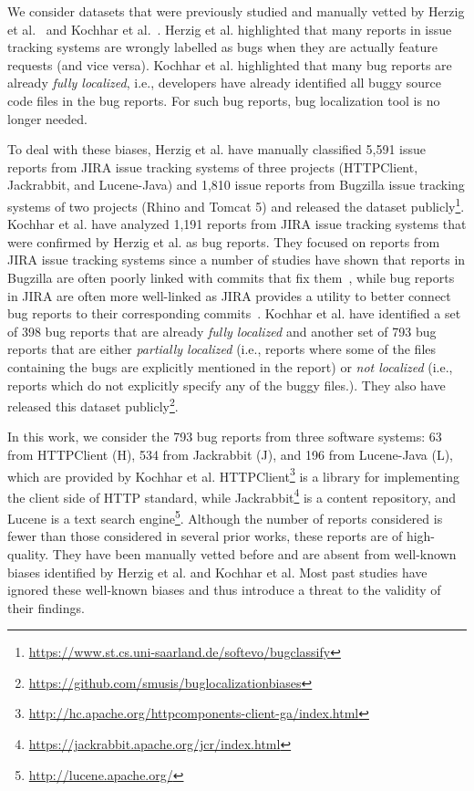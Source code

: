 We consider datasets that were previously studied and manually vetted by Herzig et al.~\cite{HerzigJZ13} and Kochhar et al.~\cite{KochharTL14}. Herzig et al. highlighted that many reports in issue tracking systems are wrongly labelled as bugs when they are actually feature requests (and vice versa). Kochhar et al. highlighted that many bug reports are already {\em fully localized}, i.e., developers have already identified all buggy source code files in the bug reports. For such bug reports, bug localization tool is no longer needed.

To deal with these biases, Herzig et al. have manually classified 5,591 issue reports from JIRA issue tracking systems of three projects (HTTPClient, Jackrabbit, and Lucene-Java) and 1,810 issue reports from Bugzilla issue tracking systems of two projects (Rhino and Tomcat 5) and released the dataset publicly\footnote{\url{https://www.st.cs.uni-saarland.de/softevo/bugclassify}}. Kochhar et al. have analyzed 1,191 reports from JIRA issue tracking systems that were confirmed by Herzig et al. as bug reports. They focused on reports from JIRA issue tracking systems since a number of studies have shown that reports in Bugzilla are often poorly linked with commits that fix them~\cite{BachmannBRDB10,BirdBADBFD09}, while bug reports in JIRA are often more well-linked as JIRA provides a utility to better connect bug reports to their corresponding commits~\cite{BissyandeTWLJR13}. Kochhar et al. have identified a set of 398 bug reports that are already {\em fully localized} and another set of 793 bug reports that are either {\em partially localized} (i.e., reports where some of the files containing the bugs are explicitly mentioned in the report) or {\em not localized} (i.e., reports which do not explicitly specify any of the buggy files.). They also have released this dataset publicly\footnote{\url{https://github.com/smusis/buglocalizationbiases}}.

In this work, we consider the 793 bug reports from three software systems: 63 from HTTPClient (H), 534 from Jackrabbit (J), and 196 from Lucene-Java (L), which are provided by Kochhar et al. HTTPClient\footnote{\url{http://hc.apache.org/httpcomponents-client-ga/index.html}} is a library for implementing the client side of HTTP standard, while Jackrabbit\footnote{\url{https://jackrabbit.apache.org/jcr/index.html}} is a content repository, and Lucene is a text search engine\footnote{\url{ http://lucene.apache.org/}}. %
Although the number of reports considered is fewer than those considered in several prior works, these reports are of high-quality. They have been manually vetted before and are absent from well-known biases identified by Herzig et al. and Kochhar et al. Most past studies have ignored these well-known biases and thus introduce a threat to the validity of their findings.


